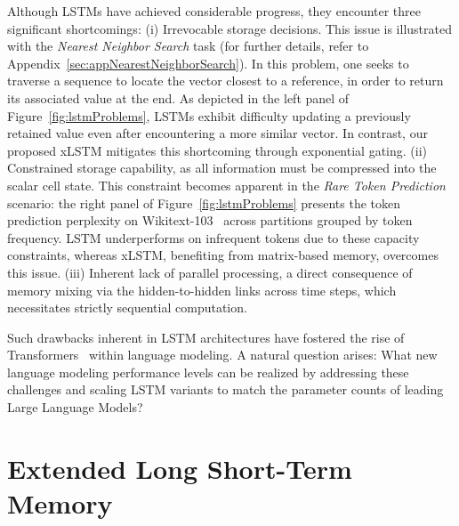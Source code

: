 Although LSTMs have achieved considerable progress, they encounter three significant shortcomings: (i) Irrevocable storage decisions. This issue is illustrated with the {\it Nearest Neighbor Search} task (for further details, refer to Appendix~\ref{sec:appNearestNeighborSearch}). In this problem, one seeks to traverse a sequence to locate the vector closest to a reference, in order to return its associated value at the end. As depicted in the left panel of Figure~\ref{fig:lstmProblems}, LSTMs exhibit difficulty updating a previously retained value even after encountering a more similar vector. In contrast, our proposed xLSTM mitigates this shortcoming through exponential gating. (ii) Constrained storage capability, as all information must be compressed into the scalar cell state. This constraint becomes apparent in the {\it Rare Token Prediction} scenario: the right panel of Figure~\ref{fig:lstmProblems} presents the token prediction perplexity on Wikitext-103~\citep{Merity:17} across partitions grouped by token frequency. LSTM underperforms on infrequent tokens due to these capacity constraints, whereas xLSTM, benefiting from matrix-based memory, overcomes this issue. (iii) Inherent lack of parallel processing, a direct consequence of memory mixing via the hidden-to-hidden links across time steps, which necessitates strictly sequential computation. 

Such drawbacks inherent in LSTM architectures have fostered the rise of Transformers~\citep{Vaswani:17} within language modeling. A natural question arises: What new language modeling performance levels can be realized by addressing these challenges and scaling LSTM variants to match the parameter counts of leading Large Language Models?

\section{Extended Long Short-Term Memory}
\label{sec:xLSTM}

